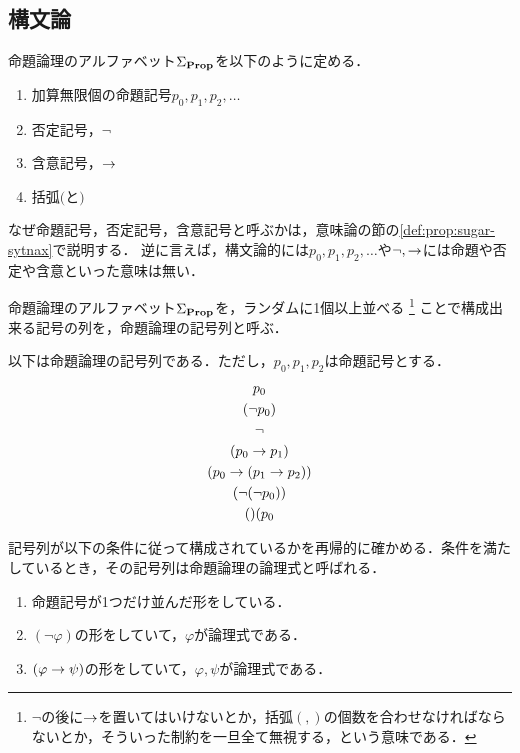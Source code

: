 \subsection{構文論}

\begin{myDefinition}
  命題論理のアルファベット$\Sigma_{\mathbf{Prop}}$を以下のように定める．
  \begin{enumerate}
    \item 加算無限個の命題記号$p_0,p_1,p_2,\dots$
    \item 否定記号，$\neg$
    \item 含意記号，$\to$
    \item 括弧$($と$)$
  \end{enumerate}
\end{myDefinition}

\begin{myRemark}
  なぜ命題記号，否定記号，含意記号と呼ぶかは，意味論の節の\ref{def:prop:sugar-sytnax}で説明する．
  逆に言えば，構文論的には$p_0,p_1,p_2,\dots$や$\neg,\to$には命題や否定や含意といった意味は無い．
\end{myRemark}

\begin{myDefinition}[命題論理の記号列]
  命題論理のアルファベット$\Sigma_{\mathbf{Prop}}$を，ランダムに1個以上並べる
  \footnote{$\lnot$の後に$\to$を置いてはいけないとか，括弧$(,)$の個数を合わせなければならないとか，そういった制約を一旦全て無視する，という意味である．}
  ことで構成出来る記号の列を，命題論理の記号列と呼ぶ．
\end{myDefinition}

\begin{myExample}[命題論理の記号列の例]
  \label{exp:prop:strings}
  以下は命題論理の記号列である．ただし，$p_0,p_1,p_2$は命題記号とする．
  \begin{gather}
    p_0 \\
    (\neg p_0) \\
    \neg \\
    (p_0 \to p_1) \\
    (p_0 \to (p_1 \to p_2)) \\
    (\lnot(\lnot p_0)) \\
    ()(p_0
  \end{gather}
\end{myExample}

\begin{myDefinition}[命題論理の論理式]
  \label{def:prop:formulae}
  記号列が以下の条件に従って構成されているかを再帰的に確かめる．条件を満たしているとき，その記号列は命題論理の論理式と呼ばれる．
  \begin{enumerate}
    \item 命題記号が1つだけ並んだ形をしている．
    \item $(\neg \varphi)$の形をしていて，$\varphi$が論理式である．
    \item $(\varphi \to \psi)$の形をしていて，$\varphi, \psi$が論理式である．
  \end{enumerate}
\end{myDefinition}

